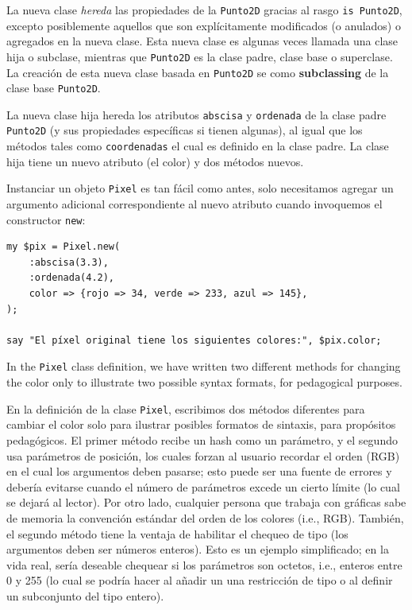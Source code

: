 La nueva clase \emph{hereda} las propiedades de la {\tt Punto2D}
gracias al rasgo {\tt is Punto2D}, excepto posiblemente
aquellos que son explícitamente modificados (o anulados) o agregados
en la nueva clase. Esta nueva clase es algunas veces llamada
una clase hija o subclase, mientras que {\tt Punto2D} es la
clase padre, clase base o superclase. La creación de esta nueva
clase basada en {\tt Punto2D} se como {\bf subclassing} de la 
clase base {\tt Punto2D}.

La nueva clase hija hereda los atributos {\tt abscisa} y 
{\tt ordenada} de la clase padre {\tt Punto2D} (y sus 
propiedades específicas si tienen algunas), al igual que los
métodos tales como {\tt coordenadas} el cual es definido en
la clase padre. La clase hija tiene un nuevo atributo (el color)
y dos métodos nuevos.

Instanciar un objeto {\tt Pixel} es tan fácil como antes,
solo necesitamos agregar un argumento adicional correspondiente
al nuevo atributo cuando invoquemos el constructor {\tt new}:
\begin{lstlisting}
my $pix = Pixel.new(
	:abscisa(3.3),
	:ordenada(4.2),
	color => {rojo => 34, verde => 233, azul => 145}, 
);

say "El píxel original tiene los siguientes colores:", $pix.color;
\end{lstlisting}

In the {\tt Pixel} class definition, we have written 
two different methods for changing the color 
only to illustrate two possible syntax formats, for pedagogical 
purposes.

En la definición de la clase {\tt Pixel}, escribimos dos métodos
diferentes para cambiar el color solo para ilustrar posibles 
formatos de sintaxis, para propósitos pedagógicos. El primer método
recibe un hash como un parámetro, y el segundo usa parámetros de posición,
los cuales forzan al usuario recordar el orden (RGB) en el cual los
argumentos deben pasarse; esto puede ser una fuente de errores y 
debería evitarse cuando el número de parámetros excede un cierto 
límite (lo cual se dejará al lector). Por otro lado, cualquier 
persona que trabaja con gráficas sabe de memoria la convención estándar 
del orden de los colores (i.e., RGB). También, el segundo método
tiene la ventaja de habilitar el chequeo de tipo (los argumentos
deben ser números enteros). Esto es un ejemplo simplificado; en la
vida real, sería deseable chequear si los parámetros son octetos, i.e.,
enteros entre 0 y 255 (lo cual se podría hacer al añadir un
una restricción de tipo o al definir un subconjunto del tipo entero).

